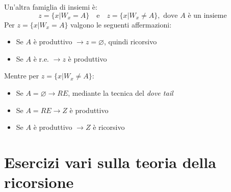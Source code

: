 \documentclass[a4paper,oneside]{scrbook}
\begin{document}
\noindent
Un'altra famiglia di insiemi è:
\begin{equation*}
    z=\{x|W_x=A\} \quad \text{e} \quad z=\{x|W_x\ne A\}, \text{ dove $A$ è un insieme}
\end{equation*}
Per $z=\{x|W_x=A\}$ valgono le seguenti affermazioni:
\begin{itemize}
    \item Se $A$ è produttivo $\rightarrow z=\varnothing$, quindi ricorsivo
    \item Se $A$ è r.e. $\rightarrow z$ è produttivo
\end{itemize}
Mentre per $z=\{x|W_x\ne A\}$:
\begin{itemize}
    \item Se $A=\varnothing \rightarrow RE$, mediante la tecnica del \textit{dove tail}
    \item Se $A=RE \rightarrow Z$ è produttivo
    \item Se $A$ è produttivo $\rightarrow Z$ è ricorsivo
\end{itemize}

\chapter{Esercizi vari sulla teoria della ricorsione}
\end{document}
